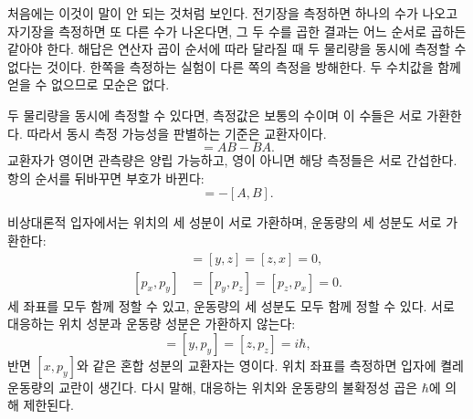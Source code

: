 처음에는 이것이 말이 안 되는 것처럼 보인다. 전기장을 측정하면 하나의 수가 나오고 자기장을 측정하면 또 다른 수가 나온다면, 그 두 수를 곱한 결과는 어느 순서로 곱하든 같아야 한다. 해답은 연산자 곱이 순서에 따라 달라질 때 두 물리량을 동시에 측정할 수 없다는 것이다. 한쪽을 측정하는 실험이 다른 쪽의 측정을 방해한다. 두 수치값을 함께 얻을 수 없으므로 모순은 없다.

두 물리량을 동시에 측정할 수 있다면, 측정값은 보통의 수이며 이 수들은 서로 가환한다. 따라서 동시 측정 가능성을 판별하는 기준은 교환자이다.
\begin{equation}
[A,B]=AB-BA.
\end{equation}
교환자가 영이면 관측량은 양립 가능하고, 영이 아니면 해당 측정들은 서로 간섭한다. 항의 순서를 뒤바꾸면 부호가 바뀐다:
\begin{equation}
[B,A]=-[A,B].
\end{equation}

비상대론적 입자에서는 위치의 세 성분이 서로 가환하며, 운동량의 세 성분도 서로 가환한다:
\begin{align}
[x,y]&=[y,z]=[z,x]=0,\\
[p_x,p_y]&=[p_y,p_z]=[p_z,p_x]=0.
\end{align}
세 좌표를 모두 함께 정할 수 있고, 운동량의 세 성분도 모두 함께 정할 수 있다. 서로 대응하는 위치 성분과 운동량 성분은 가환하지 않는다:
\begin{equation}
[x,p_x]=[y,p_y]=[z,p_z]=i\hbar,
\end{equation}
반면 \([x,p_y]\)와 같은 혼합 성분의 교환자는 영이다. 위치 좌표를 측정하면 입자에 켤레 운동량의 교란이 생긴다. 다시 말해, 대응하는 위치와 운동량의 불확정성 곱은 \(\hbar\)에 의해 제한된다.

\begin{classroomqa}\end{classroomqa}

\begin{classroomqa}\end{classroomqa}

